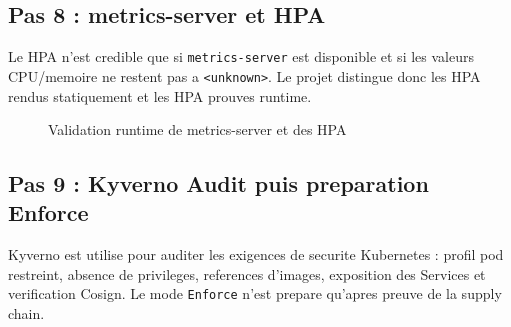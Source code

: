 \subsection{Pas 8 : metrics-server et HPA}

Le HPA n'est credible que si \texttt{metrics-server} est disponible et si les
valeurs CPU/memoire ne restent pas a \texttt{\string<unknown\string>}. Le projet distingue
donc les HPA rendus statiquement et les HPA prouves runtime.

\begin{figure}[htbp]
\centering
{}
\caption{Validation runtime de metrics-server et des HPA}
\label{fig:devsecops-hpa}
\end{figure}

\subsection{Pas 9 : Kyverno Audit puis preparation Enforce}

Kyverno est utilise pour auditer les exigences de securite Kubernetes :
profil pod restreint, absence de privileges, references d'images, exposition
des Services et verification Cosign. Le mode \texttt{Enforce} n'est prepare
qu'apres preuve de la supply chain.

